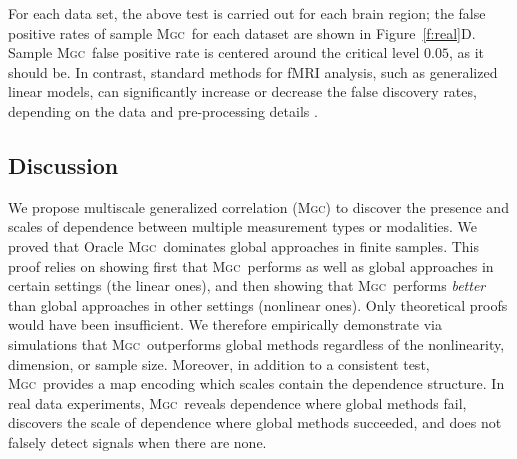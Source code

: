 \documentclass[11pt]{article}
\providecommand{\sct}[1]{{\normalfont\textsc{#1}}}
\newcommand{\Mgc}{\sct{Mgc}}
\begin{document}
For each data set, the above test is carried out for each brain region; the false positive rates of sample \Mgc~for each dataset are shown in Figure~\ref{f:real}{\color{magenta}D}. %
Sample \Mgc~false positive rate is centered around the critical level $0.05$, as it should be.
In contrast,  standard methods for fMRI analysis, such as generalized linear models, can significantly increase or decrease the false discovery rates, depending on the data and pre-processing details \cite{EklundKnutsson2012,Eklund2015}.

\subsection*{Discussion}
\label{conclu}

We propose multiscale generalized correlation (\Mgc) to discover the presence and scales of dependence between multiple measurement types or modalities.
We proved that Oracle \Mgc~dominates global approaches in finite samples.  This proof relies on showing first that \Mgc~performs as well as global approaches in certain settings (the linear ones), and then showing that \Mgc~performs \emph{better} than global approaches in other settings (nonlinear ones).  Only theoretical proofs would have been insufficient.  
We therefore empirically demonstrate via simulations that \Mgc~outperforms global methods regardless of the nonlinearity, dimension, or sample size.  Moreover, in addition to a consistent test, \Mgc~provides a map encoding which scales contain the dependence structure. %
In real data experiments, \Mgc~reveals dependence where global methods fail, discovers the scale of dependence where global methods succeeded, and does not falsely detect signals when there are none.
\end{document}
